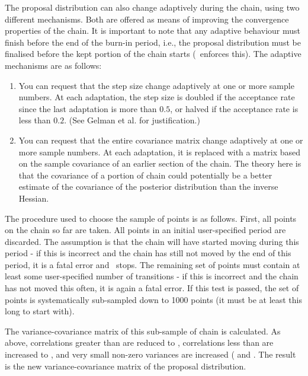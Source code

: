 The proposal distribution can also change adaptively during the chain, using two different mechanisms. Both are offered as means of improving the convergence properties of the chain. It is important to note that any adaptive behaviour must finish before the end of the burn-in period, i.e., the proposal distribution must be finalised before the kept portion of the chain starts (\SPM\ enforces this). The adaptive mechanisms are as follows: 

\begin{enumerate}
\item You can request that the step size change adaptively at one or more sample numbers. At each adaptation, the step size is doubled if the acceptance rate since the last adaptation is more than $0.5$, or halved if the acceptance rate is less than $0.2$. (See Gelman et al. \citep{823} for justification.)

\item You can request that the entire covariance matrix change adaptively at one or more sample numbers. At each adaptation, it is replaced with a matrix based on the sample covariance of an earlier section of the chain. The theory here is that the covariance of a portion of chain could potentially be a better estimate of the covariance of the posterior distribution than the inverse Hessian.
\end{enumerate}

The procedure used to choose the sample of points is as follows. First, all points on the chain so far are taken. All points in an initial user-specified period are discarded. The assumption is that the chain will have started moving during this period - if this is incorrect and the chain has still not moved by the end of this period, it is a fatal error and \SPM\ stops. The remaining set of points must contain at least some user-specified number of transitions - if this is incorrect and the chain has not moved this often, it is again a fatal error. If this test is passed, the set of points is systematically sub-sampled down to 1000 points (it must be at least this long to start with).

The variance-covariance matrix of this sub-sample of chain is calculated. As above, correlations greater than  are reduced to , correlations less than  are increased to  , and very small non-zero variances are increased ( and . The result is the new variance-covariance matrix of the proposal distribution.

